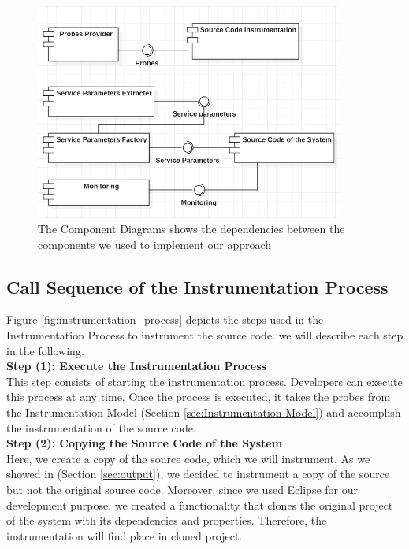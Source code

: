 \begin{figure}[h]
\centering
\includegraphics[width=0.9\textwidth]{figures/architecture}
\caption{The Component Diagrams shows the dependencies between the components we used to implement our approach}
\label{fig:architecture}
\end{figure}

\subsection{Call Sequence of the Instrumentation Process}
\label{sec:Call Sequence of the Instrumentation Process}
Figure \ref{fig:instrumentation_process} depicts the steps used in the Instrumentation Process to instrument the source code. we will describe each step in the following. \\

\textbf{Step (1): Execute the Instrumentation Process}\\
This step consists of starting the instrumentation process. Developers can execute this process at any time. Once the process is executed, it takes the probes from the Instrumentation Model (Section \ref{sec:Instrumentation Model}) and accomplish the instrumentation of the source code. \\

\textbf{Step (2): Copying the Source Code of the System}\\
Here, we create a copy of the source code, which we will instrument. As we showed in (Section \ref{sec:output}), we decided to instrument a copy of the source but not the original source code. Moreover, since we used Eclipse for our development purpose, we created a functionality that clones the original project of the system with its dependencies and properties. Therefore, the instrumentation will find place in cloned project. \\ 

